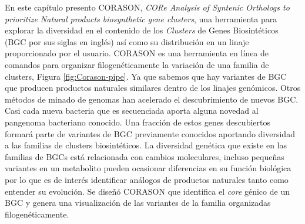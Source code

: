 \documentclass[12pt,twoside]{reedthesis}
\begin{document}
  En este capítulo presento CORASON, \emph{CORe Analysis of Syntenic
  Orthologs to prioritize Natural products biosynthetic gene clusters},
  una herramienta para explorar la diversidad en el contenido de los
  \emph{Clusters} de Genes Biosintéticos (BGC por sus siglas en inglés)
  así como su distribución en un linaje proporcionado por el usuario.
  CORASON es una herramienta en línea de comandos para organizar
  filogenéticamente la variación de una familia de clusters, Figura
  \autoref{fig:Corason-pipe}. Ya que sabemos que hay variantes de BGC que
  producen productos naturales similares dentro de los linajes genómicos.
  Otros métodos de minado de genomas han acelerado el descubrimiento de
  nuevos BGC. Casi cada nueva bacteria que es secuenciada aporta alguna
  novedad al pangenoma bacteriano conocido. Una fracción de estos genes
  descubiertos formará parte de variantes de BGC previamente conocidos
  aportando diversidad a las familias de clusters biosintéticos. La
  diversidad genética que existe en las familias de BGCs está relacionada
  con cambios moleculares, incluso pequeñas variantes en un metabolito
  pueden ocasionar diferencias en su función biológica por lo que es de
  interés identificar análogos de productos naturales tanto como entender
  su evolución. Se diseñó CORASON que identifica el \emph{core} génico de
  un BGC y genera una visualización de las variantes de la familia
  organizadas filogenéticamente.
  
\end{document}
